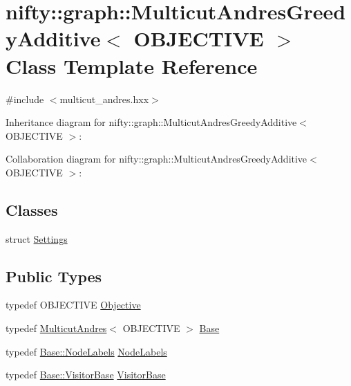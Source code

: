 \hypertarget{classnifty_1_1graph_1_1MulticutAndresGreedyAdditive}{}\section{nifty\+:\+:graph\+:\+:Multicut\+Andres\+Greedy\+Additive$<$ O\+B\+J\+E\+C\+T\+I\+V\+E $>$ Class Template Reference}
\label{classnifty_1_1graph_1_1MulticutAndresGreedyAdditive}


{\ttfamily \#include $<$multicut\+\_\+andres.\+hxx$>$}



Inheritance diagram for nifty\+:\+:graph\+:\+:Multicut\+Andres\+Greedy\+Additive$<$ O\+B\+J\+E\+C\+T\+I\+V\+E $>$\+:


Collaboration diagram for nifty\+:\+:graph\+:\+:Multicut\+Andres\+Greedy\+Additive$<$ O\+B\+J\+E\+C\+T\+I\+V\+E $>$\+:
\subsection*{Classes}
\begin{DoxyCompactItemize}
\item 
struct \hyperlink{structnifty_1_1graph_1_1MulticutAndresGreedyAdditive_1_1Settings}{Settings}
\end{DoxyCompactItemize}
\subsection*{Public Types}
\begin{DoxyCompactItemize}
\item 
typedef O\+B\+J\+E\+C\+T\+I\+V\+E \hyperlink{classnifty_1_1graph_1_1MulticutAndresGreedyAdditive_ab5aa303a6a8d2f058abb4771c9f484f0}{Objective}
\item 
typedef \hyperlink{classnifty_1_1graph_1_1MulticutAndres}{Multicut\+Andres}$<$ O\+B\+J\+E\+C\+T\+I\+V\+E $>$ \hyperlink{classnifty_1_1graph_1_1MulticutAndresGreedyAdditive_a2f59fb0e8499bc661dad779a9acf28ba}{Base}
\item 
typedef \hyperlink{classnifty_1_1graph_1_1MulticutBase_afba61ad2919d0fad20b3745af19309da}{Base\+::\+Node\+Labels} \hyperlink{classnifty_1_1graph_1_1MulticutAndresGreedyAdditive_acc7e717594fc4820cda56feb3c000fa1}{Node\+Labels}
\item 
typedef \hyperlink{classnifty_1_1graph_1_1MulticutBase_a5882fb69df59d8113f6a81a0dac26eaa}{Base\+::\+Visitor\+Base} \hyperlink{classnifty_1_1graph_1_1MulticutAndresGreedyAdditive_af4a079ac6b02b63260a05440414ed4f9}{Visitor\+Base}
\end{DoxyCompactItemize}
